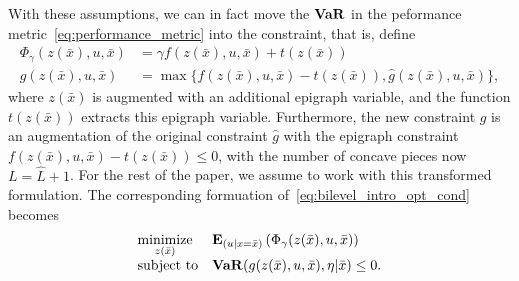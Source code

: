 \documentclass[11pt]{article}
\begin{document}
With these assumptions, we can in fact move the $\mathop{\bf VaR}$ in the peformance metric~\eqref{eq:performance_metric} into the constraint, that is, define 
\begin{align*}
\Phi_\gamma(z(\bar{x}),u,\bar{x}) &= \gamma f(z(\bar{x}),u,\bar{x}) + t(z(\bar{x}))\\
g(z(\bar{x}),u,\bar{x}) &= \max\{f(z(\bar{x}),u,\bar{x}) - t(z(\bar{x})),\hat{g}(z(\bar{x}),u,\bar{x})\},
\end{align*}
where $z(\bar{x})$ is augmented with an additional epigraph variable, and the function $t(z(\bar{x}))$ extracts this epigraph variable. Furthermore, the new constraint $g$ is an augmentation of the original constraint $\hat{g}$ with the epigraph constraint $f(z(\bar{x}),u,\bar{x}) - t(z(\bar{x})) \leq 0$, with the number of concave pieces now $L = \hat{L}+1$.
For the rest of the paper, we assume to work with this transformed formulation. The corresponding formuation of~\eqref{eq:bilevel_intro_opt_cond} becomes
\begin{equation}
	\label{eq:bilevel_intro_opt_cond_new}
	\begin{array}{ll}
		\underset{z(\bar{x})}{\mbox{minimize}} & \mathbf{E}_{(u|x = \bar{x})}\left(\Phi_\gamma(z(\bar{x}),u,\bar{x})\right) \\
		\mbox{subject to} & \mathop{\bf VaR}(g(z(\bar{x}),u,\bar{x}),\eta|\bar{x}) \leq 0.\\
	\end{array}
\end{equation}
\end{document}
